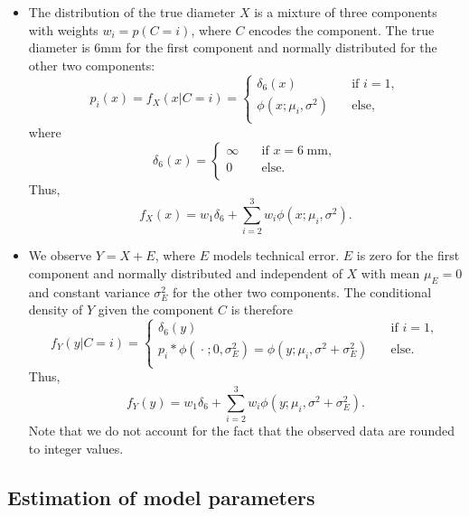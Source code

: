 \documentclass[]{article}
\begin{document}
\begin{itemize}
\item The distribution of the true diameter $X$ is a mixture of three components with weights $w_i=p(C=i)$, where $C$ encodes the component. The true diameter is 6\hspace{3pt}mm for the first component and normally distributed for the other two components:
\[
p_i(x)=f_X(x|C=i)=
  \begin{cases}
    \delta_6(x)       & \quad \text{if } i=1,\\
    \phi(x;\mu_i,\sigma^2)  & \quad \text{else,}\\
  \end{cases}
\]
where
\[ \delta_6(x) =
  \begin{cases}
    \infty       & \quad \text{if } x=6\hspace{3pt}\text{mm},\\
    0  & \quad \text{else.}\\
  \end{cases}
\]
Thus,
\[
f_X(x)=w_1\delta_6+\sum_{i=2}^3w_i\phi(x;\mu_i,\sigma^2).
\]

\item We observe $Y=X+E$, where $E$ models technical error. $E$ is zero for the first component and normally distributed and independent of $X$ with mean $\mu_E=0$ and constant variance $\sigma_E^2$ for the other two components. The conditional density of $Y$ given the component $C$ is therefore
\[ f_Y(y|C=i) =
  \begin{cases}
    \delta_6(y)       & \quad \text{if } i=1,\\
    p_i\ast\phi(\hspace{1pt}\cdot\hspace{1pt};0,\sigma_E^2)=\phi(y;\mu_i,\sigma^2+\sigma_E^2)  & \quad \text{else.}\\
  \end{cases}
\]
Thus,
\[
f_Y(y)=w_1\delta_6+\sum_{i=2}^3w_i\phi(y;\mu_i,\sigma^2+\sigma_E^2).
\]
Note that we do not account for the fact that the observed data are rounded to integer values.
\end{itemize}

\subsection{Estimation of model
parameters}\label{estimation-of-model-parameters}
\end{document}

